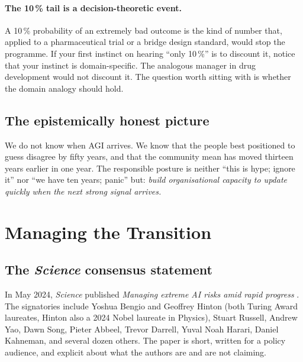 \documentclass[11pt,a4paper]{article}
\begin{document}
\paragraph{The 10\,\% tail is a decision-theoretic event.} A 10\,\%
probability of an extremely bad outcome is the kind of number that,
applied to a pharmaceutical trial or a bridge design standard, would
stop the programme. If your first instinct on hearing ``only 10\,\%''
is to discount it, notice that your instinct is domain-specific. The
analogous manager in drug development would not discount it. The
question worth sitting with is whether the domain analogy should hold.

\subsection{The epistemically honest picture}

\begin{keyinsight}
We do not know when AGI arrives. We know that the people best
positioned to guess disagree by fifty years, and that the community
mean has moved thirteen years earlier in one year. The responsible
posture is neither ``this is hype; ignore it'' nor ``we have ten years;
panic'' but: \emph{build organisational capacity to update quickly when
the next strong signal arrives.}
\end{keyinsight}

\section{Managing the Transition}\label{sec:act5}

\subsection{The \emph{Science} consensus statement}

In May 2024, \emph{Science} published \emph{Managing extreme AI risks
amid rapid progress} \citep{bengio2024managing}. The signatories
include Yoshua Bengio and Geoffrey Hinton (both Turing Award laureates,
Hinton also a 2024 Nobel laureate in Physics), Stuart Russell, Andrew
Yao, Dawn Song, Pieter Abbeel, Trevor Darrell, Yuval Noah Harari,
Daniel Kahneman, and several dozen others. The paper is short, written
for a policy audience, and explicit about what the authors are and are
not claiming.
\end{document}
